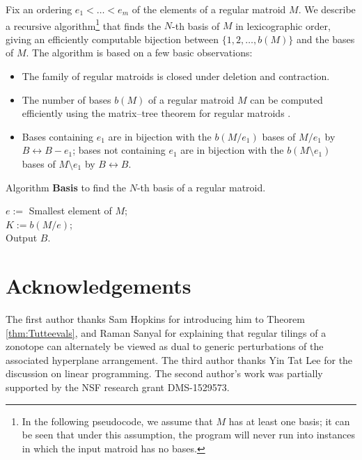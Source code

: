 \documentclass[12pt]{amsart}
\numberwithin{equation}{section}
\theoremstyle{definition}
\begin{document}
Fix an ordering $e_1<\ldots<e_m$ of the elements of a regular matroid $M$. We describe a recursive algorithm\footnote{In the following pseudocode, we assume that $M$ has at least one basis; it can be seen that under this assumption, the program will never run into instances in which the input matroid has no bases.} that finds the $N$-th basis of $M$ in lexicographic order, giving an efficiently computable bijection between $\{1,2,\ldots,b(M)\}$ and the bases of $M$. The algorithm is based on a few basic observations:
\begin{itemize}
\item The family of regular matroids is closed under deletion and contraction.
\item The number of bases $b(M)$ of a regular matroid $M$ can be computed efficiently using the matrix--tree theorem for regular matroids \cite{maurer1976matrix}. 
\item Bases containing $e_1$ are in bijection with the $b(M/e_1)$ bases of $M/e_1$ by $B\leftrightarrow B-e_1$; bases not containing $e_1$ are in bijection with the $b(M\setminus e_1)$ bases of $M\setminus e_1$ by $B\leftrightarrow B$.
\end{itemize}

\begin{algorithm}[h] \caption{Algorithm {\bf Basis} to find the $N$-th basis of a regular matroid.}
\BlankLine
{}
$e:=$ Smallest element of $M$;\\
$K:=b(M/e)$;\\
\BlankLine
Output $B$.
\label{Algo:Simple}
\end{algorithm}

\section*{Acknowledgements}

The first author thanks Sam Hopkins for introducing him to Theorem \ref{thm:Tutteevals}, and Raman Sanyal for explaining that regular tilings of a zonotope can alternately be viewed as dual to generic perturbations of the associated hyperplane arrangement. The third author thanks Yin Tat Lee for the discussion on linear programming.
The second author's work was partially supported by the NSF research grant DMS-1529573.
\end{document}
